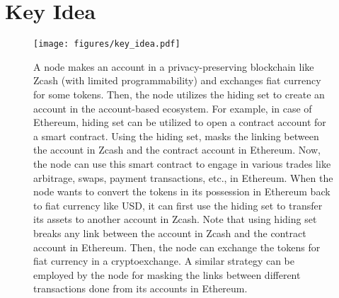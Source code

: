 \documentclass{article}
\begin{document}
\section*{Key Idea}
\begin{figure}
    \centering
    \texttt{[image: figures/key\_idea.pdf]}
    \caption{A node makes an account in a privacy-preserving blockchain like Zcash (with limited programmability) and exchanges fiat currency for some tokens. Then, the node utilizes the hiding set to create an account in the account-based ecosystem. For example, in case of Ethereum, hiding set can be utilized to open a contract account for a smart contract. Using the hiding set, masks the linking between the account in Zcash and the contract account in Ethereum. Now, the node can use this smart contract to engage in various trades like arbitrage, swaps, payment transactions, etc., in Ethereum. When the node wants to convert the tokens in its possession in Ethereum back to fiat currency like USD, it can first use the hiding set to transfer its assets to another account in Zcash. Note that using hiding set breaks any link between the account in Zcash and the contract account in Ethereum. Then, the node can exchange the tokens for fiat currency in a cryptoexchange. A similar strategy can be employed by the node for masking the links between different transactions done from its accounts in Ethereum.}
    \label{fig:key-idea}
\end{figure}
\end{document}

